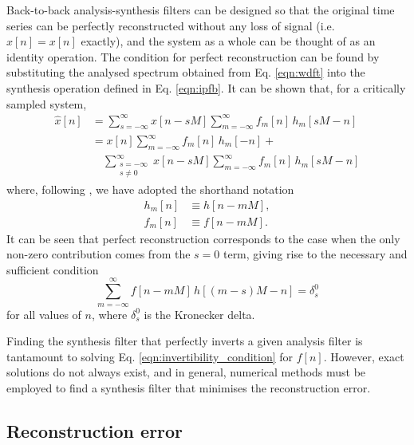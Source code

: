 \documentclass{pasa}%
\newcommand{\Kron}{\delta_s^0}
\begin{document}
Back-to-back analysis-synthesis filters can be designed so that the original time series can be perfectly reconstructed without any loss of signal (i.e. $\hat{x}[n] = x[n]$ exactly), and the system as a whole can be thought of as an identity operation.
The condition for perfect reconstruction can be found by substituting the analysed spectrum obtained from Eq. \eqref{eqn:wdft} into the synthesis operation defined in Eq. \eqref{eqn:ipfb}.
It can be shown that, for a critically sampled system,
\begin{equation}
    \begin{aligned}
        \hat{x}[n]
            &= \sum_{s = -\infty}^{\infty} x[n - sM]
               \sum_{m = -\infty}^{\infty} f_m[n]\, h_m[sM - n] \\
            &= x[n] \sum_{m = -\infty}^{\infty} f_m[n]\, h_m[-n] +{} \\
            &\quad \sum_{\substack{s = -\infty \\ s \ne 0}}^{\infty} x[n - sM]
               \sum_{m = -\infty}^{\infty} f_m[n]\, h_m[sM - n]
    \end{aligned}
    \label{eqn:backtoback}
\end{equation}
where, following \citet{Crochiere1983}, we have adopted the shorthand notation
\begin{equation}
    \begin{aligned}
        h_m[n] &\equiv h[n - mM], \\
        f_m[n] &\equiv f[n - mM].
    \end{aligned}
\end{equation}
It can be seen that perfect reconstruction corresponds to the case when the only non-zero contribution comes from the $s = 0$ term, giving rise to the necessary and sufficient condition
\begin{equation}
    \sum_{m = -\infty}^{\infty} f[n-mM]\,h[(m - s)M - n] = \Kron
    \label{eqn:invertibility_condition}
\end{equation}
for all values of $n$, where $\Kron$ is the Kronecker delta.

Finding the synthesis filter that perfectly inverts a given analysis filter is tantamount to solving Eq. \eqref{eqn:invertibility_condition} for $f[n]$.
However, exact solutions do not always exist, and in general, numerical methods must be employed to find a synthesis filter that minimises the reconstruction error.

\subsection{Reconstruction error}
\end{document}
